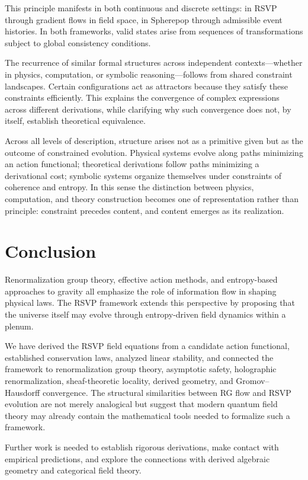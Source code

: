 \documentclass[12pt,a4paper]{article}
\theoremstyle{plain}
\theoremstyle{definition}
\theoremstyle{remark}
\begin{document}
This principle manifests in both continuous and discrete settings: in
RSVP through gradient flows in field space, in Spherepop through
admissible event histories. In both frameworks, valid states arise from
sequences of transformations subject to global consistency conditions.

The recurrence of similar formal structures across independent
contexts---whether in physics, computation, or symbolic
reasoning---follows from shared constraint landscapes. Certain
configurations act as attractors because they satisfy these constraints
efficiently. This explains the convergence of complex expressions
across different derivations, while clarifying why such convergence
does not, by itself, establish theoretical equivalence.

Across all levels of description, structure arises not as a primitive
given but as the outcome of constrained evolution. Physical systems
evolve along paths minimizing an action functional; theoretical
derivations follow paths minimizing a derivational cost; symbolic
systems organize themselves under constraints of coherence and entropy.
In this sense the distinction between physics, computation, and theory
construction becomes one of representation rather than principle:
constraint precedes content, and content emerges as its realization.

\section{Conclusion}

Renormalization group theory, effective action methods, and entropy-based
approaches to gravity all emphasize the role of information flow in
shaping physical laws. The RSVP framework extends this perspective by
proposing that the universe itself may evolve through entropy-driven
field dynamics within a plenum.

We have derived the RSVP field equations from a candidate action
functional, established conservation laws, analyzed linear stability,
and connected the framework to renormalization group theory, asymptotic
safety, holographic renormalization, sheaf-theoretic locality, derived
geometry, and Gromov--Hausdorff convergence. The structural similarities
between RG flow and RSVP evolution are not merely analogical but suggest
that modern quantum field theory may already contain the mathematical
tools needed to formalize such a framework.

Further work is needed to establish rigorous derivations, make contact
with empirical predictions, and explore the connections with derived
algebraic geometry and categorical field theory.
\end{document}
